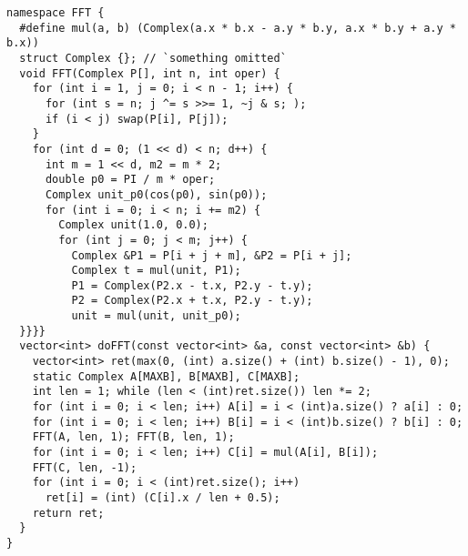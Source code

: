 \begin{lstlisting}
namespace FFT {
  #define mul(a, b) (Complex(a.x * b.x - a.y * b.y, a.x * b.y + a.y * b.x))
  struct Complex {}; // `something omitted`
  void FFT(Complex P[], int n, int oper) {
    for (int i = 1, j = 0; i < n - 1; i++) {
      for (int s = n; j ^= s >>= 1, ~j & s; );
      if (i < j) swap(P[i], P[j]);
    }
    for (int d = 0; (1 << d) < n; d++) {
      int m = 1 << d, m2 = m * 2;
      double p0 = PI / m * oper;
      Complex unit_p0(cos(p0), sin(p0));
      for (int i = 0; i < n; i += m2) {
        Complex unit(1.0, 0.0);
        for (int j = 0; j < m; j++) {
          Complex &P1 = P[i + j + m], &P2 = P[i + j];
          Complex t = mul(unit, P1);
          P1 = Complex(P2.x - t.x, P2.y - t.y);
          P2 = Complex(P2.x + t.x, P2.y - t.y);
          unit = mul(unit, unit_p0);
  }}}}
  vector<int> doFFT(const vector<int> &a, const vector<int> &b) {
    vector<int> ret(max(0, (int) a.size() + (int) b.size() - 1), 0);
    static Complex A[MAXB], B[MAXB], C[MAXB];
    int len = 1; while (len < (int)ret.size()) len *= 2;
    for (int i = 0; i < len; i++) A[i] = i < (int)a.size() ? a[i] : 0;
    for (int i = 0; i < len; i++) B[i] = i < (int)b.size() ? b[i] : 0;
    FFT(A, len, 1); FFT(B, len, 1);
    for (int i = 0; i < len; i++) C[i] = mul(A[i], B[i]);
    FFT(C, len, -1);
    for (int i = 0; i < (int)ret.size(); i++)
      ret[i] = (int) (C[i].x / len + 0.5);
    return ret;
  }
}
\end{lstlisting}